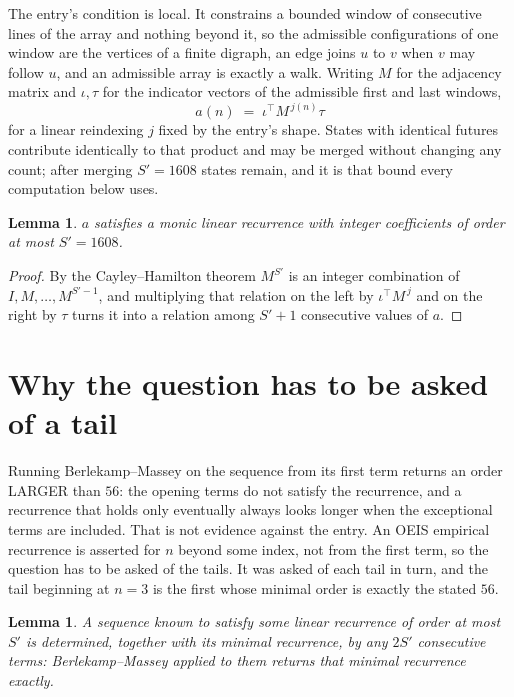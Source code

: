 \documentclass[11pt,a4paper]{article}
\theoremstyle{plain}
\newtheorem{lemma}[theorem]{Lemma}
\theoremstyle{definition}
\begin{document}
The entry's condition is local. It constrains a bounded window of consecutive lines of the
array and nothing beyond it, so the admissible configurations of one window are the vertices of
a finite digraph, an edge joins $u$ to $v$ when $v$ may follow $u$, and an admissible array is
exactly a walk. Writing $M$ for the adjacency matrix and $\iota,\tau$ for the indicator vectors
of the admissible first and last windows,
\[
a(n)\;=\;\iota^{\!\top}M^{\,j(n)}\tau
\]
for a linear reindexing $j$ fixed by the entry's shape. States with identical futures
contribute identically to that product and may be merged without changing any count; after
merging $S'=1608$ states remain, and it is that bound every computation below uses.

\begin{lemma}\label{lem:cf}
$a$ satisfies a monic linear recurrence with integer coefficients of order at most $S'=1608$.
\end{lemma}

\begin{proof}
By the Cayley--Hamilton theorem $M^{S'}$ is an integer combination of $I,M,\dots,M^{S'-1}$,
and multiplying that relation on the left by $\iota^{\!\top}M^{\,j}$ and on the right by
$\tau$ turns it into a relation among $S'+1$ consecutive values of $a$.
\end{proof}

\section{Why the question has to be asked of a tail}

Running Berlekamp--Massey on the sequence from its first term returns an order LARGER than $56$: the opening terms do not satisfy the recurrence, and a recurrence that holds only eventually always looks longer when the exceptional terms are included. That is not evidence against the entry. An OEIS empirical recurrence is asserted for $n$ beyond some index, not from the first term, so the question has to be asked of the tails. It was asked of each tail in turn, and the tail beginning at $n=3$ is the first whose minimal order is exactly the stated $56$.

\begin{lemma}\label{lem:bm}
A sequence known to satisfy some linear recurrence of order at most $S'$ is determined,
together with its minimal recurrence, by any $2S'$ consecutive terms: Berlekamp--Massey applied
to them returns that minimal recurrence exactly.
\end{lemma}
\end{document}
